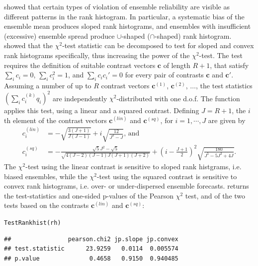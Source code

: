 \documentclass[article]{jss}\usepackage[]{graphicx}\usepackage[]{color}
\makeatletter
\newcommand{\hlstd}[1]{\textcolor[rgb]{0,0,0}{#1}}%
\newcommand{\hlkwd}[1]{\textcolor[rgb]{0,0.267,0.4}{#1}}%
\newenvironment{kframe}{%
 \def\at@end@of@kframe{}%
 \ifinner\ifhmode%
  \def\at@end@of@kframe{\end{minipage}}%
  \begin{minipage}{\columnwidth}%
 \fi\fi%
 \def\FrameCommand##1{\hskip\@totalleftmargin \hskip-\fboxsep
 \colorbox{shadecolor}{##1}\hskip-\fboxsep
     \hskip-\linewidth \hskip-\@totalleftmargin \hskip\columnwidth}%
 \MakeFramed {\advance\hsize-\width
   \@totalleftmargin\z@ \linewidth\hsize
   \@setminipage}}%
 {\par\unskip\endMakeFramed%
 \at@end@of@kframe}
\newenvironment{knitrout}{}{} %
\makeatother
\begin{document}
\citet{hamill2001interpretation} showed that certain types of violation of ensemble reliability are visible as different patterns in the rank histogram.
In particular, a systematic bias of the ensemble mean produces sloped rank histograms, and ensembles with insufficient (excessive) ensemble spread produce $\cup$-shaped ($\cap$-shaped) rank histogram.
\citet{jolliffe2008evaluating} showed that the $\chi^2$-test statistic can be decomposed to test for sloped and convex rank histograms specifically, thus increasing the power of the $\chi^2$-test.
The test requires the definition of suitable contrast vectors $\mathbf{c}$ of length $R+1$, that satisfy $\sum_i c_i = 0$, $\sum_i c_i^2 = 1$, and $\sum_i c_i c_i' = 0$ for every pair of contrasts $\mathbf{c}$ and $\mathbf{c}'$.
Assuming a number of up to $R$ contrast vectors $\mathbf{c}^{(1)}$, $\mathbf{c}^{(2)}$, $\dots$, the test statistics $(\sum_i c^{(k)}_i q_i)^2$ are independently $\chi^2$-distributed with one d.o.f. 
The function  applies this test, using a linear and a squared contrast. 
Defining $J=R+1$, the $i$th element of the contrast vectors $\mathbf{c}^{(lin)}$ and $\mathbf{c}^{(sq)}$, for $i=1,\cdots,J$ are given by
%
\begin{align}
c^{(lin)}_i & = -\sqrt{\frac{3(J+1)}{J (J-1)}} + i \sqrt{\frac{12}{J^3 - J}}\text{, and}\\
c^{(sq)}_i & =  - \frac{\sqrt{5}  J^2 - \sqrt{5}}{\sqrt{4(J - 2)  (J-1) J (J+1) (J+2)}}+ \left(i - \frac{J+1}{2}\right)^2   \sqrt{\frac{180}{ J^5 - 5 J^3 + 4 J}}.
\end{align}
%
The $\chi^2$-test using the linear contrast is sensitive to sloped rank histgrams, i.e. biased ensembles, while the $\chi^2$-test using the squared contrast is sensitive to convex rank histograms, i.e. over- or under-dispersed ensemble forecasts.
 returns the test-statistics and one-sided p-values of the Pearson $\chi^2$ test, and of the two tests based on the contrasts $\mathbf{c}^{(lin)}$ and $\mathbf{c}^{(sq)}$:

\begin{knitrout}
\color{fgcolor}\begin{kframe}
\begin{alltt}
\hlkwd{TestRankhist}\hlstd{(rh)}
\end{alltt}
\begin{verbatim}
##                pearson.chi2 jp.slope jp.convex
## test.statistic      23.9259   0.0114  0.005574
## p.value              0.4658   0.9150  0.940485
\end{verbatim}
\end{kframe}
\end{knitrout}
\end{document}
